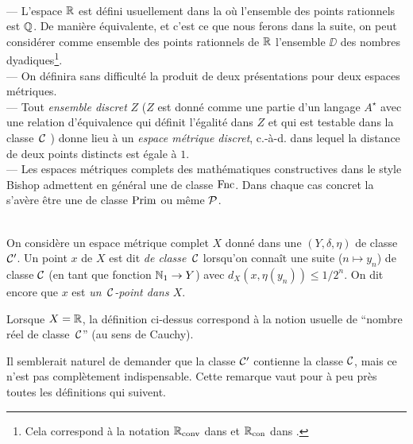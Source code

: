 \begin{fexamples} \label{f213}~\\
--- L'espace  $\mathbb {R}$  est défini usuellement dans la \pres où l'ensemble des 
points rationnels est  $\mathbb {Q}$.  De manière équivalente, et c'est ce que nous 
ferons dans la suite, on peut considérer comme ensemble des points rationnels 
de  $\mathbb {R}$  l'ensemble  $\DD$  des nombres dyadiques{\footnote{Cela correspond 
à la notation $\mathbb {R}_{\rm conv}$  dans \cite{fLL}  et   $\mathbb {R}_{\rm con}$  dans 
\cite{fKo83}.}}.\\ 
--- On définira sans difficulté la \pres produit de deux présentations 
pour deux espaces métriques.\\ 
--- Tout {\em ensemble discret}  $Z$  ($Z$  est donné comme une partie d'un 
langage  $A^{\star}$  avec une relation d'équivalence qui définit 
l'égalité dans  $Z$  et qui est testable dans la classe~${{\cal C}}$  )  donne 
lieu à un {\em espace métrique discret}, c.-à-d. dans lequel la distance 
de deux points distincts est égale à  $1$. \\
--- Les espaces métriques complets des mathématiques constructives dans le 
style Bishop \cite{fBB} admettent en général une \rp  de classe  ${\rm Fnc}$. 
Dans chaque cas concret la \pres s'avère être une \pres de classe ${\rm Prim}$ ou 
même  ${\cal P}$. 
\end{fexamples}

\begin{fdefinition} \label{f214}~\\
On considère un espace métrique complet  $X$  donné dans  une \pres  
$(Y,\delta,\eta)$  de classe ${{\cal C}}'$. Un point  $x$  de  $X$  est dit {\em de 
classe}~${{\cal C}}$   lorsqu'on connaît une suite  ($n \mapsto y_n$)  de classe 
${{\cal C}}$  (en tant que fonction   $\mathbb {N}_1   \rightarrow   Y$)   avec   
$d_X(x,\eta(y_n)) \leq 1/2^n$.
 On dit encore que  $x$  est {\em un~${{\cal C}}$-point dans  $X$}.
\end{fdefinition}

\begin{fexample}  \label{f215}
Lorsque  $X = \mathbb {R}$, la définition ci-dessus correspond à la notion usuelle 
de ``nombre réel de classe~${{\cal C}}$''    (au sens de Cauchy).
\end{fexample}

\begin{fremark}\label{f216}
Il semblerait naturel de demander que la classe ${{\cal C}}'$ contienne la classe  
${{\cal C}}$, mais ce n'est pas complètement indispensable. Cette remarque vaut pour  à peu près toutes les définitions qui suivent.
\end{fremark}



